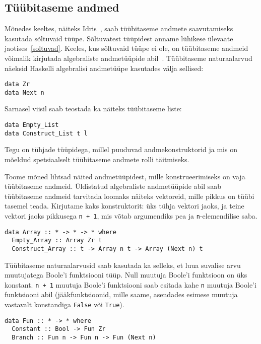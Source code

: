 \documentclass[12pt]{article}
\begin{document}
    \subsection{Tüübitaseme andmed}\label{tyybitasemeandmed}
      Mõnedes keeltes, näiteks Idris~\cite{The_Idr}, saab tüübitaseme andmete saavutamiseks kasutada sõltuvaid tüüpe. Sõltuvatest tüüpidest anname lühikese ülevaate jaotises~\ref{soltuvad}. Keeles, kus sõltuvaid tüüpe ei ole, on tüübitaseme andmeid võimalik kirjutada algebraliste andmetüüpide abil~\cite{Giv}. Tüübitaseme naturaalarvud näeksid Haskelli algebralisi andmetüüpe kasutades välja sellised:

      \begin{verbatim}data Zr
data Next n\end{verbatim}

      Sarnasel viisil saab teostada ka näiteks tüübitaseme liste:

      \begin{verbatim}data Empty_List
data Construct_List t l\end{verbatim}

      Tegu on tühjade tüüpidega, millel puuduvad andmekonstruktorid ja mis on mõeldud spetsiaalselt tüübitaseme andmete rolli täitmiseks.

      Toome mõned lihtsad näited andmetüüpidest, mille konstrueerimiseks on vaja tüübitaseme andmeid. Üldistatud algebraliste andmetüüpide abil saab tüübitaseme andmeid tarvitada loomaks näiteks vektoreid, mille pikkus on tüübi tasemel teada. Kirjutame kaks konstruktorit: üks tühja vektori jaoks, ja teine vektori jaoks pikkusega \verb!n + 1!, mis võtab argumendiks pea ja \verb!n!-elemendilise saba.

      \begin{verbatim}data Array :: * -> * -> * where
  Empty_Array :: Array Zr t
  Construct_Array :: t -> Array n t -> Array (Next n) t\end{verbatim}

      Tüübitaseme naturaalarvusid saab kasutada ka selleks, et luua suvalise arvu muutujatega Boole'i funktsiooni tüüp. Null muutuja Boole'i funktsioon on üks konstant. \verb!n + 1! muutuja Boole'i funktsiooni saab esitada kahe \verb!n! muutuja Boole'i funktsiooni abil (jääkfunktsioonid, mille saame, asendades esimese muutuja vastavalt konstandiga \verb!False! või \verb!True!).

      \begin{verbatim}data Fun :: * -> * where
  Constant :: Bool -> Fun Zr
  Branch :: Fun n -> Fun n -> Fun (Next n)\end{verbatim}
\end{document}

